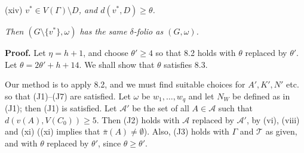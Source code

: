 (xiv) \textit{$v^* \in V(\Gamma) \setminus D$, and $d(v^*, D) \ge \theta$.}

\textit{Then $(G \setminus \{v^*\}, \omega)$ has the same $\delta$-folio as $(G, \omega)$.}

\textbf{Proof.} Let $\eta = h + 1$, and choose $\theta' \ge 4$ so that 8.2 holds with $\theta$ replaced by $\theta'$. Let $\theta = 2\theta' + h + 14$. We shall show that $\theta$ satisfies 8.3.

Our method is to apply 8.2, and we must find suitable choices for $A', K', N'$ etc. so that (J1)--(J7) are satisfied. Let $\omega$ be $w_1, \dots, w_q$ and let $N_W$ be defined as in (J1); then (J1) is satisfied. Let $\mathcal{A}'$ be the set of all $A \in \mathcal{A}$ such that $d(v(A), V(C_0)) \ge 5$. Then (J2) holds with $\mathcal{A}$ replaced by $\mathcal{A}'$, by (vi), (viii) and (xi) ((xi) implies that $\bar{\pi}(A) \ne \emptyset$). Also, (J3) holds with $\Gamma$ and $\mathcal{T}$ as given, and with $\theta$ replaced by $\theta'$, since $\theta \ge \theta'$.
